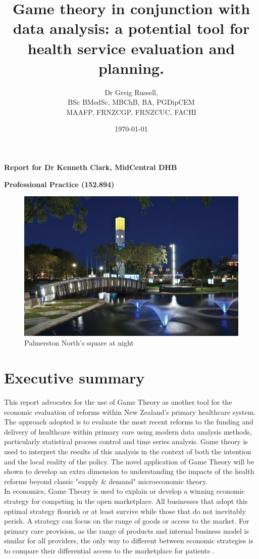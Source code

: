 \documentclass[11pt,a4paper]{article}
\title{\textbf{Game theory in conjunction with data analysis: a potential tool for health service evaluation and planning.}}
\author{Dr Greig Russell, \\ BSc BMedSc, MBChB, BA, PGDipCEM \\ MAAFP, FRNZCGP, FRNZCUC, FACHI}
\date{\today}
\begin{document}
\maketitle

\Large{\textbf{Report for Dr Kenneth Clark, MidCentral DHB}}


\Large{\textbf{Professional Practice (152.894)}}
\newline
\newline
\newline
\begin{figure}[htp]
\centering
\includegraphics[scale=0.6]{PN.png}
\caption{Palmerston North's square at night}
\label{}
\end{figure}


\pagebreak
\section{Executive summary}
This report advocates for the use of Game Theory as another tool for the economic evaluation of reforms within New Zealand's primary healthcare system. The approach adopted is to evaluate the most recent reforms to the funding and delivery of healthcare within primary care using modern data analysis methods, particularly statistical process control and time series analysis. Game theory is used to interpret the results of this analysis in the context of both the intention and the local reality of the policy. The novel application of Game Theory will be shown to develop an extra dimension to understanding the impacts of the health reforms beyond classic "supply \& demand" microeconomic theory.\\


In economics, Game Theory is used to explain or develop a winning economic strategy for competing in the open marketplace. All businesses that adopt this optimal strategy flourish or at least survive while those that do not inevitably perish. A strategy can focus on the range of goods or access to the market. For primary care provision, as the range of products and internal business model is similar for all providers, the only way to different between economic strategies is to compare their differential access to the marketplace for patients \citep{dinar2008game}. \\
\end{document}
